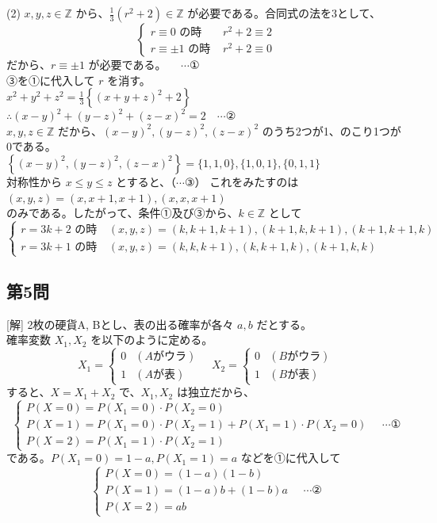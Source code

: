 \documentclass[../main.tex]{subfiles}
\begin{document}
(2) $x, y, z \in \mathbb{Z}$ から、$\frac{1}{3}(r^2+2) \in \mathbb{Z}$ が必要である。合同式の法を$3$として、
\[
\begin{cases}
r \equiv 0 \text{ の時 } & r^2 + 2 \equiv 2 \\
r \equiv \pm 1 \text{ の時 } & r^2 + 2 \equiv 0
\end{cases}
\]
だから、$r \equiv \pm 1$ が必要である。 $\quad \cdots \text{①}$\\
③を①に代入して $r$ を消す。\\
$x^2 + y^2 + z^2 = \frac{1}{3} \left\{ (x+y+z)^2 + 2 \right\}$\\
$\therefore (x-y)^2 + (y-z)^2 + (z-x)^2 = 2 \quad \cdots \text{②}$\\
$x, y, z \in \mathbb{Z}$ だから、$(x-y)^2, (y-z)^2, (z-x)^2$ のうち2つが1、のこり1つが0である。\\
$\left\{ (x-y)^2, (y-z)^2, (z-x)^2 \right\} = \{1, 1, 0\}, \{1, 0, 1\}, \{0, 1, 1\}$\\
対称性から $x \le y \le z$ とすると、（$\cdots \text{③}$） これをみたすのは\\
$(x, y, z) = (x, x+1, x+1), (x, x, x+1)$\\
のみである。したがって、条件①及び③から、$k \in \mathbb{Z}$ として
\[
\begin{cases}
r = 3k+2 \text{ の時 } & (x, y, z) = (k, k+1, k+1), (k+1, k, k+1), (k+1, k+1, k) \\
r = 3k+1 \text{ の時 } & (x, y, z) = (k, k, k+1), (k, k+1, k), (k+1, k, k)
\end{cases}
\]

\subsection*{第5問}
[解] 2枚の硬貨A, Bとし、表の出る確率が各々 $a, b$ だとする。\\
確率変数 $X_1, X_2$ を以下のように定める。
\[
X_1 =
\begin{cases} 0 & (A\text{がウラ}) \\ 1 & (A\text{が表})
\end{cases} \quad X_2 =
\begin{cases} 0 & (B\text{がウラ}) \\ 1 & (B\text{が表})
\end{cases}
\]
すると、$X = X_1 + X_2$ で、$X_1, X_2$ は独立だから、
\[
\begin{cases}
P(X=0) = P(X_1=0) \cdot P(X_2=0) \\
P(X=1) = P(X_1=0) \cdot P(X_2=1) + P(X_1=1) \cdot P(X_2=0) \\
P(X=2) = P(X_1=1) \cdot P(X_2=1)
\end{cases} \quad \cdots \text{①}
\]
である。$P(X_1=0) = 1-a, P(X_1=1) = a$ などを①に代入して
\[
\begin{cases}
P(X=0) = (1-a)(1-b) \\
P(X=1) = (1-a)b + (1-b)a \\
P(X=2) = ab
\end{cases} \quad \cdots \text{②}
\]
\end{document}
